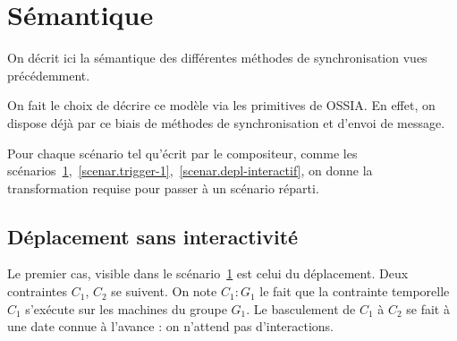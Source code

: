 \documentclass[10pt]{article}
\newcommand\ossia{OSSIA\xspace}
\begin{document}

\section{Sémantique}\label{sec.semantique}
On décrit ici la sémantique des différentes méthodes de synchronisation vues précédemment.

On fait le choix de décrire ce modèle via les primitives de \ossia{}. 
En effet, on dispose déjà par ce biais de méthodes de synchronisation et d'envoi de message.

Pour chaque scénario tel qu'écrit par le compositeur, comme les scénarios~\ref{scenar.simple},~\ref{scenar.trigger-1},~\ref{scenar.depl-interactif}, on donne la transformation requise pour passer à un scénario réparti.


\subsection{Déplacement sans interactivité}
\begin{figure}[h]
    \centering
    \begin{tikzpicture}
    
    \end{tikzpicture}
    \label{scenar.simple}
\end{figure} 

Le premier cas, visible dans le scénario~\ref{scenar.simple} est celui du déplacement.
Deux contraintes $C_1$, $C_2$ se suivent. 
On note $C_1 : G_1$ le fait que la contrainte temporelle $C_1$ s'exécute sur les machines du groupe $G_1$.
Le basculement de $C_1$ à $C_2$ se fait à une date connue à l'avance : on n'attend pas d'interactions.
\end{document}
